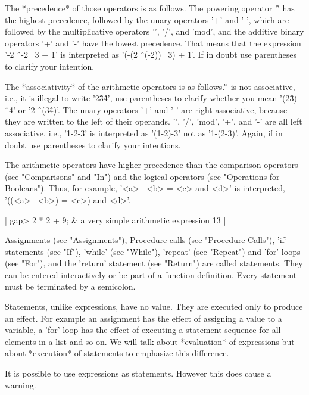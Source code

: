 The *precedence* of those operators is as follows.  The powering operator
'\^' has  the highest precedence, followed by the unary operators '+' and
'-',  which are followed by the  multiplicative  operators '\*', '/', and
'mod', and  the additive  binary operators '+' and  '-'  have  the lowest
precedence.   That  means that the expression  '-2 \^\ -2 \*\  3 + 1'  is
interpreted as '(-(2  \^\ (-2)) \*\ 3) + 1'.  If in doubt use parentheses
to clarify your intention.

The *associativity* of the arithmetic operators is as follows.'\^' is not
associative,  i.e., it is  illegal to write '2\^3\^4', use parentheses to
clarify whether  you mean '(2\^3)  \^\  4' or '2 \^\ (3\^4)'.  The  unary
operators '+' and '-' are right associative, because they are written  to
the left of their operands.  '\*', '/', 'mod', '+',  and '-' are all left
associative, i.e., '1-2-3' is interpreted as '(1-2)-3'  not as '1-(2-3)'.
Again, if in doubt use parentheses to clarify your intentions.

The  arithmetic  operators  have higher  precedence  than  the comparison
operators (see  "Comparisons" and  "In")  and the logical  operators (see
"Operations for  Booleans").  Thus, for  example, '<a> \*\ <b> =  <c> and
<d>' is interpreted, '((<a> \*\ <b>) = <c>) and <d>'.

|    gap> 2 * 2 + 9;    & a very simple arithmetic expression
    13 |

%

Assignments (see "Assignments"), Procedure calls (see "Procedure Calls"),
'if'  statements  (see  "If"),  'while'  (see  "While"),  'repeat'   (see
"Repeat") and  'for'  loops (see "For"), and the 'return'  statement (see
"Return") are called statements.  They can be entered interactively or be
part of a function definition.  Every statement must  be terminated by  a
semicolon.

Statements, unlike expressions, have no value.  They are executed only to
produce an effect.  For example an assignment has the effect of assigning
a   value to a  variable, a  'for' loop   has the  effect  of executing a
statement sequence for  all elements in a  list and so  on.  We will talk
about *evaluation* of expressions  but about *execution* of statements to
emphasize this difference.

It is possible to use expressions as statements.  However this does cause
a warning.

